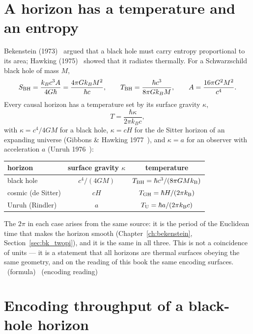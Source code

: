 \section{A horizon has a temperature and an entropy}\label{sec:bh_thermo}
Bekenstein (1973)~\cite{Bekenstein1973} argued that a black hole must carry entropy proportional to its area; Hawking (1975)~\cite{Hawking1975} showed that it radiates thermally. For a
Schwarzschild black hole of mass $M$,
\begin{equation}
S_{\rm BH}=\frac{k_Bc^3A}{4G\hbar}=\frac{4\pi Gk_BM^2}{\hbar c},\qquad T_{\rm BH}=\frac{\hbar c^3}{8\pi Gk_BM},\qquad A=\frac{16\pi G^2M^2}{c^4}.
\end{equation}
Every causal horizon has a temperature set by its surface gravity $\kappa$,
\begin{equation}
T=\frac{\hbar\kappa}{2\pi k_Bc},\label{eq:bh_Tuniv}
\end{equation}
with $\kappa=c^4/4GM$ for a black hole, $\kappa=cH$ for the de Sitter horizon of an expanding universe (Gibbons \& Hawking 1977~\cite{GibbonsHawking1977}), and $\kappa=a$ for an
observer with acceleration $a$ (Unruh 1976~\cite{Unruh1976}):
\begin{center}\small\begin{tabular}{lcc}\toprule
horizon & surface gravity $\kappa$ & temperature\\\midrule
black hole & $c^4/(4GM)$ & $T_{\rm BH}=\hbar c^3/(8\pi GMk_{\mathrm B})$\\
cosmic (de Sitter) & $cH$ & $T_{\rm GH}=\hbar H/(2\pi k_{\mathrm B})$\\
Unruh (Rindler) & $a$ & $T_{\rm U}=\hbar a/(2\pi k_{\mathrm B} c)$\\\bottomrule
\end{tabular}\end{center}
The $2\pi$ in each case arises from the same source: it is the period of the Euclidean time that makes the horizon smooth (Chapter~\ref{ch:bekenstein},
Section~\ref{sec:bk_twopi}), and it is the same in all three. This is not a coincidence of units --- it is a statement that all horizons are thermal surfaces
obeying the same geometry, and on the reading of this book the same encoding surfaces. \derived\ (formula) \interp\ (encoding reading)

\section{Encoding throughput of a black-hole horizon}\label{sec:bh_throughput}
